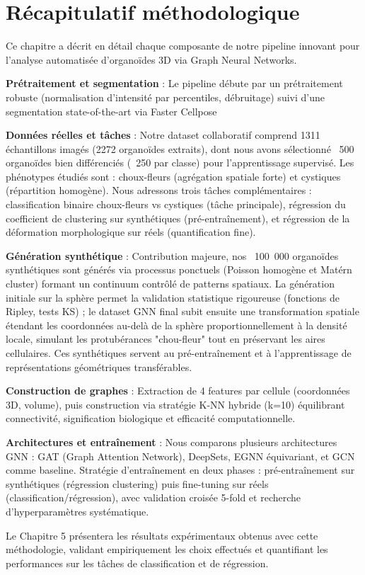 \section{Récapitulatif méthodologique}

Ce chapitre a décrit en détail chaque composante de notre pipeline innovant pour l'analyse automatisée d'organoïdes 3D via Graph Neural Networks.

\textbf{Prétraitement et segmentation} : Le pipeline débute par un prétraitement robuste (normalisation d'intensité par percentiles, débruitage) suivi d'une segmentation state-of-the-art via Faster Cellpose

\textbf{Données réelles et tâches} : Notre dataset collaboratif comprend 1311 échantillons imagés (2272 organoïdes extraits), dont nous avons sélectionné ~500 organoïdes bien différenciés (~250 par classe) pour l'apprentissage supervisé. Les phénotypes étudiés sont : choux-fleurs (agrégation spatiale forte) et cystiques (répartition homogène). Nous adressons trois tâches complémentaires : classification binaire choux-fleurs vs cystiques (tâche principale), régression du coefficient de clustering sur synthétiques (pré-entraînement), et régression de la déformation morphologique sur réels (quantification fine).

\textbf{Génération synthétique} : Contribution majeure, nos ~100~000 organoïdes synthétiques sont générés via processus ponctuels (Poisson homogène et Matérn cluster) formant un continuum contrôlé de patterns spatiaux. La génération initiale sur la sphère permet la validation statistique rigoureuse (fonctions de Ripley, tests KS) ; le dataset GNN final subit ensuite une transformation spatiale étendant les coordonnées au-delà de la sphère proportionnellement à la densité locale, simulant les protubérances "chou-fleur" tout en préservant les aires cellulaires. Ces synthétiques servent au pré-entraînement et à l'apprentissage de représentations géométriques transférables.

\textbf{Construction de graphes} : Extraction de 4 features par cellule (coordonnées 3D, volume), puis construction via stratégie K-NN hybride (k=10) équilibrant connectivité, signification biologique et efficacité computationnelle.

\textbf{Architectures et entraînement} : Nous comparons plusieurs architectures GNN : GAT (Graph Attention Network), DeepSets, EGNN équivariant, et GCN comme baseline. Stratégie d'entraînement en deux phases : pré-entraînement sur synthétiques (régression clustering) puis fine-tuning sur réels (classification/régression), avec validation croisée 5-fold et recherche d'hyperparamètres systématique.

Le Chapitre 5 présentera les résultats expérimentaux obtenus avec cette méthodologie, validant empiriquement les choix effectués et quantifiant les performances sur les tâches de classification et de régression.
